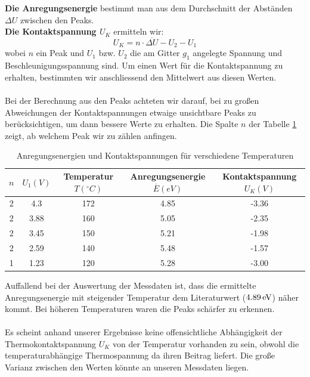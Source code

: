 \documentclass[a4paper,titlepage]{scrartcl}
\numberwithin{equation}{section}
\begin{document}
\textbf{Die Anregungsenergie} bestimmt man aus dem Durchschnitt der Abständen $\Delta U$ zwischen den Peaks.\\
\textbf{Die Kontaktspannung $U_K$} ermitteln wir:
\begin{equation*}
U_K=n \cdot \overline{\Delta U} - U_2 - U_1
\end{equation*}
wobei $n$ ein Peak und $U_{1}$ bzw. $U_2$ die am Gitter $g_1$ angelegte Spannung und Beschleunigungsspannung sind. Um einen Wert für die Kontaktspannung zu erhalten, bestimmten wir anschliessend den Mittelwert aus diesen Werten.\\ \\
Bei der Berechnung aus den Peaks achteten wir darauf, bei zu großen Abweichungen der Kontaktspannungen etwaige unsichtbare Peaks zu berücksichtigen, um dann bessere Werte zu erhalten. Die Spalte $n$ der Tabelle \ref{tab:aufgabe12} zeigt, ab welchem Peak wir zu zählen anfingen.
\begin{table}[H]
\caption{Anregungsenergien und Kontaktspannungen für verschiedene Temperaturen}
\begin{tabular}{c|c|c|c|c}
	$n$ & $U_1 (V)$ & Temperatur $T (^{\circ} C)$ & Anregungsenergie $\overline{E} (eV)$ & Kontaktspannung $U_K (V)$ \\
	\hline
	2 & 4.3 & 172 & 4.85 & -3.36 \\
	2 & 3.88 & 160 & 5.05 & -2.35 \\
	2 & 3.45 & 150 & 5.21 & -1.98 \\
	2 & 2.59 & 140 & 5.48 & -1.57 \\
	1 & 1.23 & 120 & 5.28 & -3.00 \\
\end{tabular}
\label{tab:aufgabe12}
\end{table}

Auffallend bei der Auswertung der Messdaten ist, dass die ermittelte Anregungsenergie mit steigender Temperatur dem Literaturwert ($\unit[4.89]{eV}$) näher kommt. Bei höheren Temperaturen waren die Peaks schärfer zu erkennen.\\ \\
Es scheint anhand unserer Ergebnisse keine offensichtliche Abhängigkeit der Thermokontaktspannung $U_K$ von der Temperatur vorhanden zu sein, obwohl die temperaturabhängige Thermospannung da ihren Beitrag liefert. Die große Varianz zwischen den Werten könnte an unseren Messdaten liegen.
\end{document}
